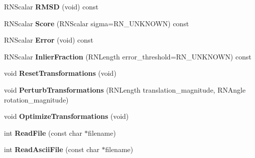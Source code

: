 \begin{DoxyCompactItemize}
\item 
R\+N\+Scalar {\bfseries R\+M\+SD} (void) const \hypertarget{struct_f_e_t_reconstruction_a5654bba9ff58dbae94b8c7ab6c72536f}{}\label{struct_f_e_t_reconstruction_a5654bba9ff58dbae94b8c7ab6c72536f}

\item 
R\+N\+Scalar {\bfseries Score} (R\+N\+Scalar sigma=R\+N\+\_\+\+U\+N\+K\+N\+O\+WN) const \hypertarget{struct_f_e_t_reconstruction_a26042eaf1eef39184d35991c0838cd79}{}\label{struct_f_e_t_reconstruction_a26042eaf1eef39184d35991c0838cd79}

\item 
R\+N\+Scalar {\bfseries Error} (void) const \hypertarget{struct_f_e_t_reconstruction_a411bfb2517daea7c9203807ca8393a29}{}\label{struct_f_e_t_reconstruction_a411bfb2517daea7c9203807ca8393a29}

\item 
R\+N\+Scalar {\bfseries Inlier\+Fraction} (R\+N\+Length error\+\_\+threshold=R\+N\+\_\+\+U\+N\+K\+N\+O\+WN) const \hypertarget{struct_f_e_t_reconstruction_ae046024eaf87b398b3e86e5b65a81b23}{}\label{struct_f_e_t_reconstruction_ae046024eaf87b398b3e86e5b65a81b23}

\item 
void {\bfseries Reset\+Transformations} (void)\hypertarget{struct_f_e_t_reconstruction_a9c23e5c281053c520029197166138307}{}\label{struct_f_e_t_reconstruction_a9c23e5c281053c520029197166138307}

\item 
void {\bfseries Perturb\+Transformations} (R\+N\+Length translation\+\_\+magnitude, R\+N\+Angle rotation\+\_\+magnitude)\hypertarget{struct_f_e_t_reconstruction_a14958dee9eacd851686ec54b4b56c7ef}{}\label{struct_f_e_t_reconstruction_a14958dee9eacd851686ec54b4b56c7ef}

\item 
void {\bfseries Optimize\+Transformations} (void)\hypertarget{struct_f_e_t_reconstruction_a321e6a9398162e96bbf41fcb044d78ae}{}\label{struct_f_e_t_reconstruction_a321e6a9398162e96bbf41fcb044d78ae}

\item 
int {\bfseries Read\+File} (const char $\ast$filename)\hypertarget{struct_f_e_t_reconstruction_a49395b37a185d4effe5662b7895eb12c}{}\label{struct_f_e_t_reconstruction_a49395b37a185d4effe5662b7895eb12c}

\item 
int {\bfseries Read\+Ascii\+File} (const char $\ast$filename)\hypertarget{struct_f_e_t_reconstruction_afae9f722623a9118e63f06bd4a375b77}{}\label{struct_f_e_t_reconstruction_afae9f722623a9118e63f06bd4a375b77}


\end{DoxyCompactItemize}
